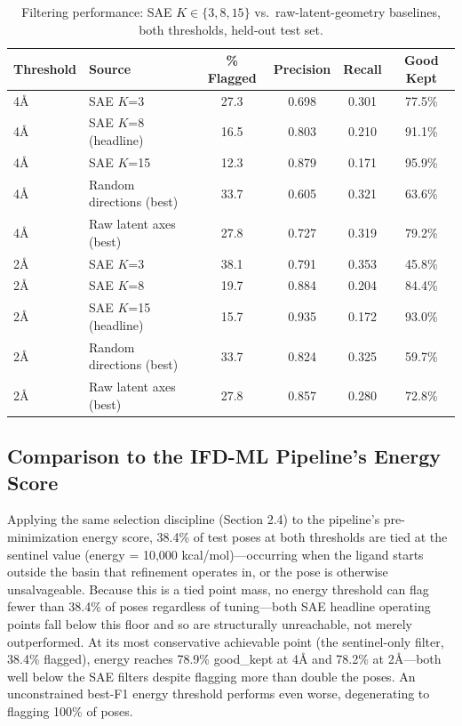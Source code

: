 \documentclass{article}
\begin{document}
\begin{table}[!ht]
\caption{Filtering performance: SAE $K \in \{3,8,15\}$ vs.\ raw-latent-geometry baselines, both thresholds, held-out test set.}
\label{tab:filtering}
\centering
\begin{small}
\begin{tabular}{llcccc}
\toprule
Threshold & Source & \% Flagged & Precision & Recall & Good Kept \\
\midrule
4Å & SAE $K$=3            & 27.3 & 0.698 & 0.301 & 77.5\% \\
4Å & SAE $K$=8 (headline)  & 16.5 & 0.803 & 0.210 & 91.1\% \\
4Å & SAE $K$=15            & 12.3 & 0.879 & 0.171 & 95.9\% \\
4Å & Random directions (best) & 33.7 & 0.605 & 0.321 & 63.6\% \\
4Å & Raw latent axes (best)   & 27.8 & 0.727 & 0.319 & 79.2\% \\
\midrule
2Å & SAE $K$=3            & 38.1 & 0.791 & 0.353 & 45.8\% \\
2Å & SAE $K$=8            & 19.7 & 0.884 & 0.204 & 84.4\% \\
2Å & SAE $K$=15 (headline) & 15.7 & 0.935 & 0.172 & 93.0\% \\
2Å & Random directions (best) & 33.7 & 0.824 & 0.325 & 59.7\% \\
2Å & Raw latent axes (best)   & 27.8 & 0.857 & 0.280 & 72.8\% \\
\bottomrule
\end{tabular}
\end{small}
\end{table}

\subsection{Comparison to the IFD-ML Pipeline's Energy Score}

Applying the same selection discipline (Section 2.4) to the pipeline's pre-minimization energy score, 38.4\% of test poses at both thresholds are tied at the sentinel value (energy = 10,000 kcal/mol)---occurring when the ligand starts outside the basin that refinement operates in, or the pose is otherwise unsalvageable. Because this is a tied point mass, no energy threshold can flag fewer than 38.4\% of poses regardless of tuning---both SAE headline operating points fall below this floor and so are structurally unreachable, not merely outperformed. At its most conservative achievable point (the sentinel-only filter, 38.4\% flagged), energy reaches 78.9\% good\_kept at 4Å and 78.2\% at 2Å---both well below the SAE filters despite flagging more than double the poses. An unconstrained best-F1 energy threshold performs even worse, degenerating to flagging 100\% of poses.
\end{document}
